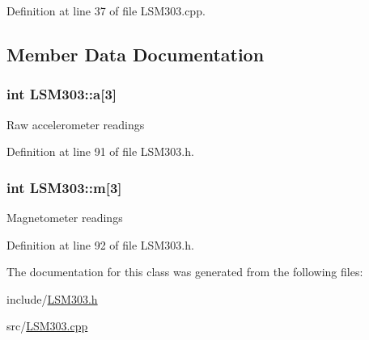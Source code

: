 \-Definition at line 37 of file \-L\-S\-M303.\-cpp.



\subsection{\-Member \-Data \-Documentation}
\hypertarget{class_l_s_m303_ad71c39fa2c1dfd978c9e93b48a6a9310}{
\subsubsection[{a}]{\setlength{\rightskip}{0pt plus 5cm}int {\bf \-L\-S\-M303\-::a}\mbox{[}3\mbox{]}}}\label{class_l_s_m303_ad71c39fa2c1dfd978c9e93b48a6a9310}
\-Raw accelerometer readings 

\-Definition at line 91 of file \-L\-S\-M303.\-h.

\hypertarget{class_l_s_m303_a606cb6a86d385c4c4a9767f6b1bf2ea5}{
\subsubsection[{m}]{\setlength{\rightskip}{0pt plus 5cm}int {\bf \-L\-S\-M303\-::m}\mbox{[}3\mbox{]}}}\label{class_l_s_m303_a606cb6a86d385c4c4a9767f6b1bf2ea5}
\-Magnetometer readings 

\-Definition at line 92 of file \-L\-S\-M303.\-h.



\-The documentation for this class was generated from the following files\-:\begin{DoxyCompactItemize}
\item 
include/\hyperlink{_l_s_m303_8h}{\-L\-S\-M303.\-h}\item 
src/\hyperlink{_l_s_m303_8cpp}{\-L\-S\-M303.\-cpp}\end{DoxyCompactItemize}
